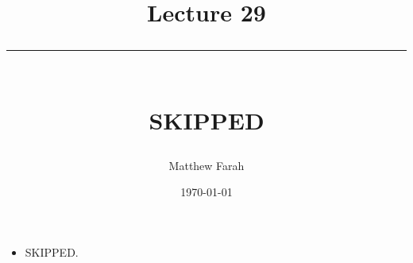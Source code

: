 \documentclass{article}
\date{
	\vspace{-.75em}
	{\large \today}
}
\title{
	\vspace*{-1.5em}
	{\Huge Lecture 29} \\
	\vspace{-1em}
	\rule{\textwidth/4}{.01em} \\
	\vspace{-.25em}
	{\Large SKIPPED}
	\vspace{-.75em}
}
\author{
	{\large Matthew Farah}
}
\begin{document}
\maketitle
\pagestyle{fancy}

\fi


\begin{itemize}
	\item SKIPPED.
\end{itemize}

\ifdefined\iscombined
	\newpage
\else
	
\end{document}
